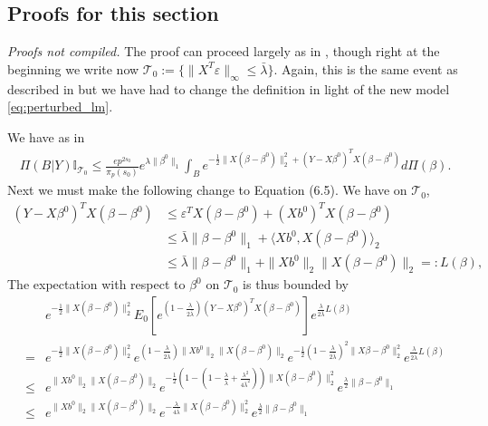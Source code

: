 \documentclass[11pt]{article}
\renewenvironment{proof}[1]{\par\noindent{\bf #1 \ }}{\hfill\BlackBox\\[2mm]}
\renewenvironment{proof}[1]{\textit{Proofs not compiled.}}{}
\newcommand{\eps}{\varepsilon}
\newcommand{\T}{\mathcal{T}}
\newcommand{\bezero}{\beta^0}
\numberwithin{equation}{section}
\begin{document}
\subsection{Proofs for this section}
\begin{proof}{Proof of Theorem \ref{thm:dimension_no_deconfounding}}
The proof can proceed largely as in \cite{CS-HV2015}, though right at the beginning we write now $\T_0 := \{\|X^T \eps\|_\infty \leq \bar{\lambda}\}$. Again, this is the same event as described in \cite{CS-HV2015} but we have had to change the definition in light of the new model \eqref{eq:perturbed_lm}.

We have as in \cite{CS-HV2015}
\begin{align*}
\Pi(B | Y) \mathbb{I}_{\T_0} \leq \frac{ep^{2s_0}}{\pi_p(s_0)}e^{\lambda\|\bezero\|_1} \int_B e^{-\frac{1}{2}\|X(\beta - \bezero)\|_2^2 + (Y - X \bezero)^T X(\beta - \bezero) }d\Pi(\beta).
\end{align*}
Next we must make the following change to Equation (6.5). We have on $\T_0$,
\begin{align*}
	(Y-X\beta^0)^TX(\beta - \beta^0) &\leq \eps^T X(\beta - \beta^0)+(Xb^0)^TX(\beta - \beta^0) \\
	&\leq \bar{\lambda}\|\beta - \beta^0\|_1 + \langle Xb^0, X(\beta - \beta^0)\rangle_2 \\
	&\leq \bar{\lambda}\|\beta - \beta^0\|_1 + \|Xb^0\|_2 \|X(\beta - \beta^0)\|_2 =: L(\beta),
\end{align*} 
The expectation with respect to $\beta^0$ on $\T_0$ is thus bounded by
\begin{align*}
&e^{-\frac{1}{2} \|X(\beta - \bezero)\|_2^2}	E_{0}\left[ e^{(1-\frac{\lambda}{2\bar{\lambda}})(Y - X \bezero)^T X(\beta - \bezero)}\right]e^{\frac{\lambda}{2\bar{\lambda}}L(\beta)} \\
=& e^{-\frac{1}{2} \|X(\beta - \bezero)\|_2^2}e^{(1-\frac{\lambda}{2\bar{\lambda}})\|Xb^0\|_2 \|X(\beta - \bezero)\|_2}e^{-\frac{1}{2}(1-\frac{\lambda}{2\bar{\lambda}})^2\|X\beta - \bezero\|_2^2}e^{\frac{\lambda}{2\bar{\lambda}}L(\beta)} \\
\leq & e^{\|Xb^0\|_2 \|X(\beta - \bezero)\|_2} e^{-\frac{1}{2} (1 - (1 - \frac{\lambda}{\bar{\lambda}} + \frac{\lambda^2}{4\bar{\lambda}^2}))\|X(\beta - \bezero)\|_2^2}e^{\frac{\lambda}{2}\|\beta - \bezero\|_1} \\
\leq & e^{\|Xb^0\|_2 \|X(\beta - \bezero)\|_2} e^{-\frac{\lambda}{4\bar{\lambda}}\|X(\beta - \bezero)\|_2^2}e^{\frac{\lambda}{2}\|\beta - \bezero\|_1} 
\end{align*} 


\end{proof}
\end{document}
